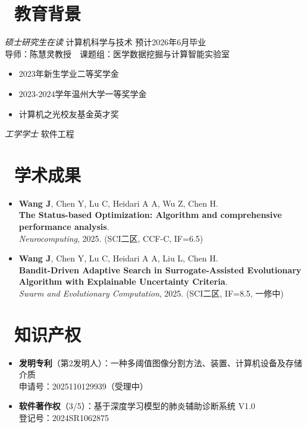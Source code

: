 \documentclass{resume}
\begin{document}
\vspace{0.4cm}

\section{\faGraduationCap\ 教育背景}
\textit{硕士研究生在读} \quad 计算机科学与技术 \quad 预计2026年6月毕业\\
导师：陈慧灵教授 课题组：医学数据挖掘与计算智能实验室

\begin{itemize}
  \item 2023年新生学业二等奖学金
  \item 2023-2024学年温州大学一等奖学金
  \item 计算机之光校友基金英才奖
\end{itemize}

\textit{工学学士} \quad 软件工程

\section{\faFileTextO\ 学术成果}
\begin{itemize}
  \item \textbf{Wang J}, Chen Y, Lu C, Heidari A A, Wu Z, Chen H.\\
  \textbf{The Status-based Optimization: Algorithm and comprehensive performance analysis}.\\
  \textit{Neurocomputing}, 2025. (SCI二区, CCF-C, IF=6.5)

  \item \textbf{Wang J}, Chen Y, Lu C, Heidari A A, Liu L, Chen H.\\
  \textbf{Bandit-Driven Adaptive Search in Surrogate-Assisted Evolutionary Algorithm with Explainable Uncertainty Criteria}.\\
  \textit{Swarm and Evolutionary Computation}, 2025. (SCI二区, IF=8.5, 一修中)
\end{itemize}

\section{\faKey\ 知识产权}
\begin{itemize}
  \item \textbf{发明专利}（第2发明人）：一种多阈值图像分割方法、装置、计算机设备及存储介质\\
  申请号：2025110129939（受理中）
  \item \textbf{软件著作权}（3/5）：基于深度学习模型的肺炎辅助诊断系统 V1.0\\
  登记号：2024SR1062875
\end{itemize}
\end{document}
